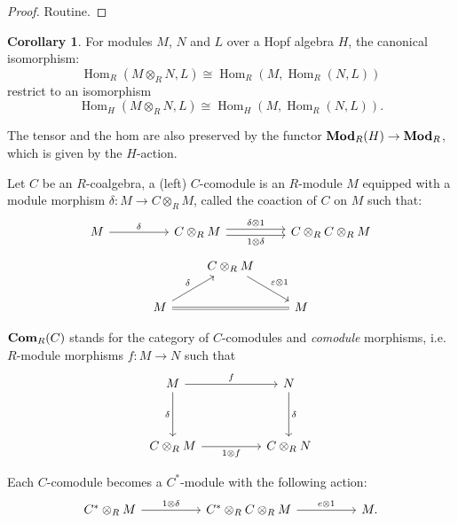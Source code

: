 \documentclass[8pt]{article}
\theoremstyle{definition}
\theoremstyle{definition}
\theoremstyle{definition}
\theoremstyle{definition}
\theoremstyle{definition}
\theoremstyle{definition}
\theoremstyle{definition}
\theoremstyle{definition}
\theoremstyle{definition}
\theoremstyle{definition}
\theoremstyle{definition}
\theoremstyle{definition}
\theoremstyle{definition}
\theoremstyle{definition}
\newtheorem{col}{Corollary}[section]
\theoremstyle{question}
\begin{document}
\begin{proof}
  Routine.
\end{proof}

\begin{col}
  For modules $M$, $N$ and $L$ over a Hopf algebra $H$, the canonical isomorphism:
  \[
  \operatorname{Hom}_R(M \otimes_R N, L) \cong \operatorname{Hom}_R(M, \operatorname{Hom}_R(N, L))
  \]
  restrict to an isomorphism
  \[
  \operatorname{Hom}_H(M \otimes_R N, L) \cong \operatorname{Hom}_H(M, \operatorname{Hom}_R(N, L)).
  \]
\end{col}
The tensor and the hom are also preserved by the functor ${\bf Mod}_R(H) \to {\bf Mod}_R$, which is given by the $H$-action.

Let $C$ be an $R$-coalgebra, a (left) $C$-comodule is an $R$-module $M$ equipped with a module morphism $\delta : M \to C \otimes_R M$,
called the coaction of $C$ on $M$ such that:
\[
\begin{tikzcd}
  M \ar[rr, "\delta"] && C \otimes_R M \ar[rr, shift left, "\delta \otimes 1"] \ar[rr, shift right, "1 \otimes \delta"'] && C \otimes_R C \otimes_R M
\end{tikzcd}
\]
\[
\begin{tikzcd}
& C \otimes_R M \ar[dr, "\varepsilon \otimes 1"] \\
M \ar[rr, equal] \ar[ur, "\delta"] && M
\end{tikzcd}
\]

${\bf Com}_R(C)$ stands for the category of $C$-comodules and \emph{comodule} morphisms, i.e. $R$-module morphisms $f : M \to N$ such that
\[
\begin{tikzcd}
M \ar[rr, "f"] \ar[dd, "\delta"'] && N \ar[dd, "\delta"] \\
\\
C \otimes_R M \ar[rr, "1 \otimes f"'] && C \otimes_R N
\end{tikzcd}
\]

Each $C$-comodule becomes a $C^*$-module with the following action:
\[
\begin{tikzcd}
  C^* \otimes_R M \ar[rr, "1 \otimes \delta"] && C^* \otimes_R C \otimes_R M \ar[rr, "e \otimes 1"] && M.
\end{tikzcd}
\]
\end{document}
